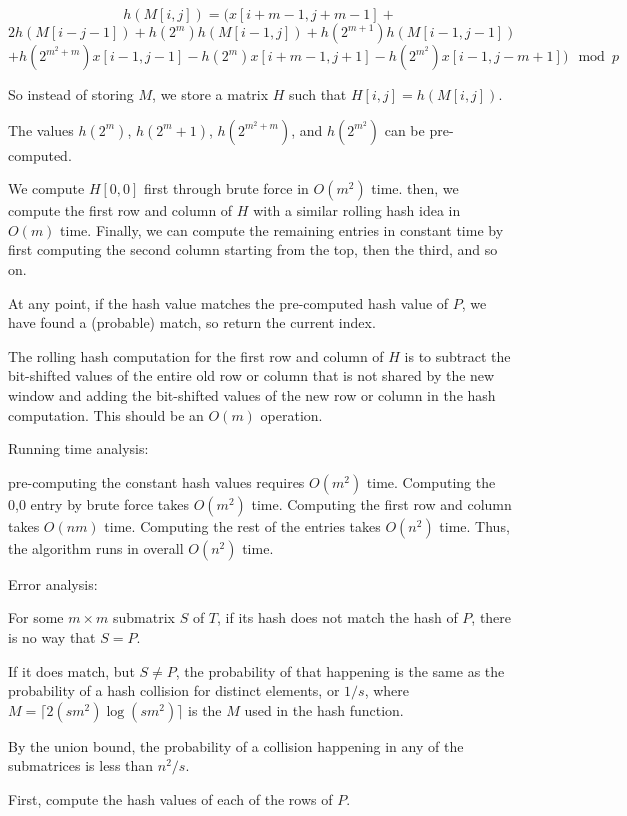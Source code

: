 \documentclass{article}
\begin{document}
$$h(M[i,j]) = (x[i+m-1, j+m-1] +$$
$$2h(M[i - j - 1]) + h(2^m) h(M[i - 1, j]) + h(2^{m+1})h(M[i-1,j-1])$$
$$+h(2^{m^2+m})x[i-1, j-1] - h(2^m)x[i+m-1,j+1] - h(2^{m^2})x[i-1,j-m+1]) \mod p$$

So instead of storing $M$, we store a matrix $H$ such that $H[i,j] =
h(M[i,j])$.

The values $h(2^m)$, $h(2^m+1)$, $h(2^{m^2+m})$, and $h(2^{m^2})$ can be
pre-computed.

We compute $H[0,0]$ first through brute force in $O(m^2)$ time. then, we
compute the first row and column of $H$ with a similar rolling hash idea in
$O(m)$ time. Finally, we can compute the remaining entries in constant time
by first computing the second column starting from the top, then the third,
and so on.

At any point, if the hash value matches the pre-computed hash value of $P$, we
have found a (probable) match, so return the current index.

The rolling hash computation for the first row and column of $H$ is to
subtract the bit-shifted values of the entire old row or column that is not shared by the new
window and adding the bit-shifted values of the new row or column in the hash
computation. This should be an $O(m)$ operation.

Running time analysis:

pre-computing the constant hash values requires $O(m^2)$ time. Computing the
0,0 entry by brute force takes $O(m^2)$ time. Computing the first row and
column takes $O(nm)$ time. Computing the rest of the entries takes
$O(n^2)$ time. Thus, the algorithm runs in overall $O(n^2)$ time.

Error analysis:

For some $m \times m$ submatrix $S$ of $T$, if its hash does not match the hash of $P$,
there is no way that $S = P$.

If it does match, but $S \neq P$, the probability of that happening is the
same as the probability of a hash collision for distinct elements, or $1/s$,
where $M = \lceil 2(sm^2)\log(sm^2) \rceil$ is the $M$ used in the hash function.

By the union bound, the probability of a collision happening in any of the
submatrices is less than $n^2/s$.

\pagebreak

First, compute the hash values of each of the rows of $P$.
\end{document}

